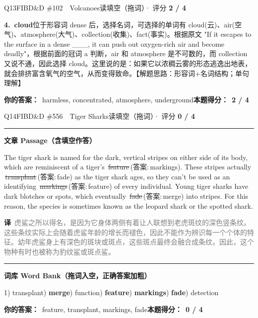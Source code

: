 \documentclass[11pt]{article}
\newcommand{\ptesub}[1]{%
  \par\needspace{2\baselineskip}\smallskip
  {\color{cAccent}\rule[-0.2ex]{3pt}{1.05em}}\hspace{6pt}%
  {\bfseries\color{cHead}#1}\par\nopagebreak\smallskip}
\newcommand{\zh}[1]{{\footnotesize\textcolor{cNote}{\textbf{译}}\ \textcolor{gray}{#1}}}
\newcommand{\rno}[2]{{\color{cWrong}\ding{55}\,\sout{#1}}\,{\footnotesize\color{cFix}(答案:\,#2)}}  %
\begin{document}
\begin{qblock}{Q13\quad FIBD\&D \#102\ \ Volcanoes}{读填空（拖词）· 评分 \textcolor{cAccent}{\bfseries 2 / 4}}
\begin{notebox}
\textbf{4.\ cloud}\quad 位于形容词 dense 后，选择名词，可选择的单词有 cloud(云)、air(空气)、atmosphere(大气)、collection(收集)、fact(事实)。根据原文 "If it escapes to the surface in a dense \_\_\_, it can push out oxygen-rich air and become deadly"，根据前面的冠词 a 判断，air 和 atmosphere 是不可数的，而 collection 又说不通，因此选择 cloud。这里说的是：如果它以浓稠云雾的形态逃逸出地表，就会排挤富含氧气的空气，从而变得致命。【解题思路：形容词+名词结构；单句理解】
\end{notebox}
\par\smallskip
\textbf{你的答案：}\ harmless, concentrated, {\color{cWrong}atmosphere, underground}\qquad\textbf{本题得分：}\ {\color{cAccent}\bfseries 2 / 4}
\end{qblock}

\begin{qblock}{Q14\quad FIBD\&D \#556\ \ Tiger Sharks}{读填空（拖词）· 评分 \textcolor{cAccent}{\bfseries 0 / 4}}
\ptesub{文章 Passage（含填空作答）}
\begin{promptbox}
The tiger shark is named for the dark, vertical stripes on either side of its body, which are reminiscent of a tiger's \rno{feature}{markings}. These stripes actually \rno{transplant}{fade} as the tiger shark ages, so they can't be used as an identifying \rno{markings}{feature} of every individual. Young tiger sharks have dark blotches or spots, which eventually \rno{fade}{merge} into stripes. For this reason, the species is sometimes known as the leopard shark or the spotted shark.
\end{promptbox}
\zh{虎鲨之所以得名，是因为它身体两侧有着让人联想到老虎斑纹的深色竖条纹。这些条纹实际上会随着虎鲨年龄的增长而褪色，因此不能作为辨识每一个个体的特征。幼年虎鲨身上有深色的斑块或斑点，这些斑点最终会融合成条纹。因此，这个物种有时也被称为豹纹鲨或斑点鲨。}
\ptesub{词库 Word Bank（拖词入空，正确答案加粗）}
{\small 1) transplant) \textbf{merge}) function) \textbf{feature}) \textbf{markings}) \textbf{fade}) detection}
\par\smallskip
\textbf{你的答案：}\ {\color{cWrong}feature, transplant, markings, fade}\qquad\textbf{本题得分：}\ {\color{cAccent}\bfseries 0 / 4}
\end{qblock}
\end{document}
